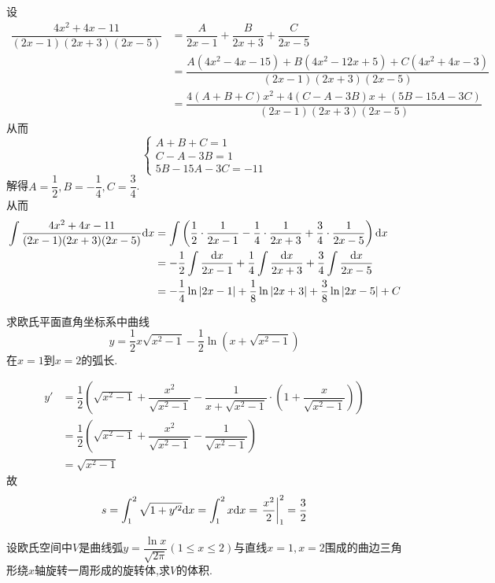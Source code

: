 \documentclass{ctexart}
\begin{document}
\begin{solution}[Solution.]
    设
    \begin{align*}
        \dfrac{4x^2+4x-11}{(2x-1)(2x+3)(2x-5)}
        &= \dfrac{A}{2x-1}+\dfrac{B}{2x+3}+\dfrac{C}{2x-5} \\
        &= \dfrac{A(4x^2-4x-15)+B(4x^2-12x+5)+C(4x^2+4x-3)}{(2x-1)(2x+3)(2x-5)} \\
        &= \dfrac{4(A+B+C)x^2+4(C-A-3B)x+(5B-15A-3C)}{(2x-1)(2x+3)(2x-5)}
    \end{align*}
    从而$$\left\{\begin{array}{l}
        A+B+C=1 \\
        C-A-3B=1 \\
        5B-15A-3C=-11
    \end{array}\right.$$
    解得$A=\dfrac{1}{2},B=-\dfrac{1}{4},C=\dfrac{3}{4}$.\\
    从而\begin{align*}
        \int{\dfrac{4x^2+4x-11}{(2x-1)(2x+3)(2x-5)}\mathrm{d}x}
        &= \int\left(\dfrac{1}{2}\cdot\dfrac{1}{2x-1}-\dfrac{1}{4}\cdot\dfrac{1}{2x+3}+\dfrac{3}{4}\cdot\dfrac{1}{2x-5}\right)\mathrm{d} x\\
        &= -\dfrac{1}{2}\int{\dfrac{\mathrm{d}x}{2x-1}}+\dfrac{1}{4}\int{\dfrac{\mathrm{d}x}{2x+3}}+\dfrac{3}{4}\int{\dfrac{\mathrm{d}x}{2x-5}} \\
        &= -\dfrac{1}{4}\ln{\left|2x-1\right|}+\dfrac{1}{8}\ln{\left|2x+3\right|}+\dfrac{3}{8}\ln{\left|2x-5\right|}+C
    \end{align*}
\end{solution}
\begin{problem}[5.(10分)]
    求欧氏平面直角坐标系中曲线$$y=\dfrac{1}{2}x\sqrt{x^2-1}-\dfrac{1}{2}\ln{\left(x+\sqrt{x^2-1}\right)}$$在$x=1$到$x=2$的弧长.
\end{problem}
\begin{solution}[Solution.]
    \begin{align*}
        y'
        &= \dfrac{1}{2}\left(\sqrt{x^2-1}+\dfrac{x^2}{\sqrt{x^2-1}}-\dfrac{1}{x+\sqrt{x^2-1}}\cdot\left(1+\dfrac{x}{\sqrt{x^2-1}}\right)\right) \\
        &= \dfrac{1}{2}\left(\sqrt{x^2-1}+\dfrac{x^2}{\sqrt{x^2-1}}-\dfrac{1}{\sqrt{x^2-1}}\right) \\
        &= \sqrt{x^2-1}
    \end{align*}
    故$$s=\int_{1}^{2}{\sqrt{1+y'^2}\mathrm{d} x}=\int_{1}^{2}{x\mathrm{d} x}=\left.\dfrac{x^2}{2}\right|_1^2=\dfrac{3}{2}$$
\end{solution}
\begin{problem}[6.(10分)]
    设欧氏空间中$V$是曲线弧$\displaystyle y=\dfrac{\ln{x}}{\sqrt{2\pi}}(1\leqslant x\leqslant 2)$与直线$x=1,x=2$围成的曲边三角形绕$x$轴旋转一周形成的旋转体,求$V$的体积.
\end{problem}
\end{document}
